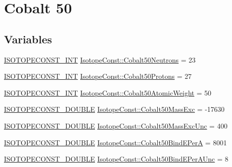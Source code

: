 \hypertarget{group___isotope_const-_cobalt-_co50}{}\section{Cobalt 50}
\label{group___isotope_const-_cobalt-_co50}
\subsection*{Variables}
\begin{DoxyCompactItemize}
\item 
\mbox{\hyperlink{group___isotope_const-_macros_ga5f18360b3e99483a35c32d789e62621c}{I\+S\+O\+T\+O\+P\+E\+C\+O\+N\+S\+T\+\_\+\+I\+NT}} \mbox{\hyperlink{group___isotope_const-_cobalt-_co50_ga7ff43c7eaa031dd02f128d9df421dc26}{Isotope\+Const\+::\+Cobalt50\+Neutrons}} = 23
\item 
\mbox{\hyperlink{group___isotope_const-_macros_ga5f18360b3e99483a35c32d789e62621c}{I\+S\+O\+T\+O\+P\+E\+C\+O\+N\+S\+T\+\_\+\+I\+NT}} \mbox{\hyperlink{group___isotope_const-_cobalt-_co50_ga1465bcb3e837b40e6bc72509ea151f58}{Isotope\+Const\+::\+Cobalt50\+Protons}} = 27
\item 
\mbox{\hyperlink{group___isotope_const-_macros_ga5f18360b3e99483a35c32d789e62621c}{I\+S\+O\+T\+O\+P\+E\+C\+O\+N\+S\+T\+\_\+\+I\+NT}} \mbox{\hyperlink{group___isotope_const-_cobalt-_co50_ga56063e1cb6dfac265b00c0deef77ce33}{Isotope\+Const\+::\+Cobalt50\+Atomic\+Weight}} = 50
\item 
\mbox{\hyperlink{group___isotope_const-_macros_ga8f45a7272ce02c0b4c65c44636ed719a}{I\+S\+O\+T\+O\+P\+E\+C\+O\+N\+S\+T\+\_\+\+D\+O\+U\+B\+LE}} \mbox{\hyperlink{group___isotope_const-_cobalt-_co50_ga1a9a301042c86c919439dfce19cd96c4}{Isotope\+Const\+::\+Cobalt50\+Mass\+Exc}} = -\/17630
\item 
\mbox{\hyperlink{group___isotope_const-_macros_ga8f45a7272ce02c0b4c65c44636ed719a}{I\+S\+O\+T\+O\+P\+E\+C\+O\+N\+S\+T\+\_\+\+D\+O\+U\+B\+LE}} \mbox{\hyperlink{group___isotope_const-_cobalt-_co50_gac68c57a8fa77faadd4525e94865b29a4}{Isotope\+Const\+::\+Cobalt50\+Mass\+Exc\+Unc}} = 400
\item 
\mbox{\hyperlink{group___isotope_const-_macros_ga8f45a7272ce02c0b4c65c44636ed719a}{I\+S\+O\+T\+O\+P\+E\+C\+O\+N\+S\+T\+\_\+\+D\+O\+U\+B\+LE}} \mbox{\hyperlink{group___isotope_const-_cobalt-_co50_gaefff15e8a729765109850b7ee546f4af}{Isotope\+Const\+::\+Cobalt50\+Bind\+E\+PerA}} = 8001
\item 
\mbox{\hyperlink{group___isotope_const-_macros_ga8f45a7272ce02c0b4c65c44636ed719a}{I\+S\+O\+T\+O\+P\+E\+C\+O\+N\+S\+T\+\_\+\+D\+O\+U\+B\+LE}} \mbox{\hyperlink{group___isotope_const-_cobalt-_co50_ga076adb0be89d599aaa6d010f9b1ab5f6}{Isotope\+Const\+::\+Cobalt50\+Bind\+E\+Per\+A\+Unc}} = 8

\end{DoxyCompactItemize}
